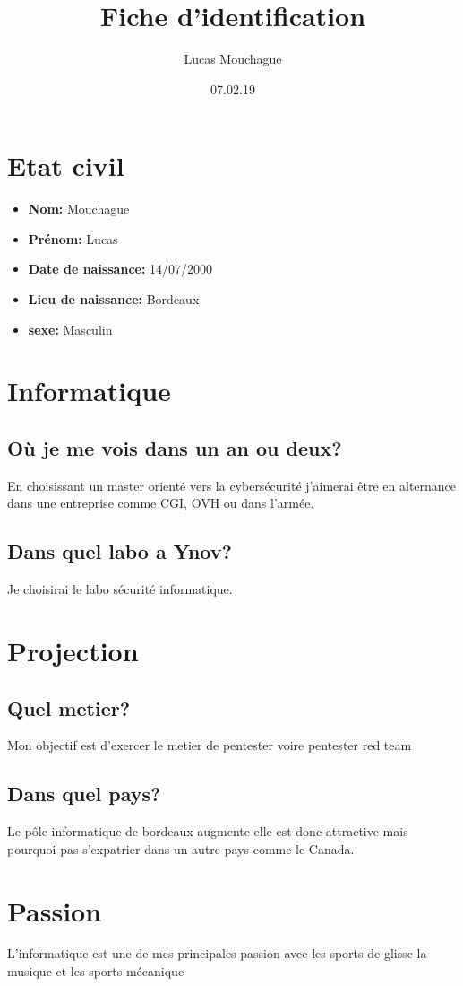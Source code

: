\documentclass{article}
\title{Fiche d'identification}
\author{Lucas Mouchague }
\date{07.02.19}
\begin{document}
\maketitle

\section{Etat civil}

\begin{itemize}
    \item\textbf{Nom:} Mouchague
    \item\textbf{Prénom:} Lucas   
    \item\textbf{Date de naissance:} 14/07/2000
    \item\textbf{Lieu de naissance:} Bordeaux
    \item\textbf{sexe:} Masculin
\end{itemize}

\section{Informatique}

\subsection{Où je me vois dans un an ou deux?}
En choisissant un master orienté vers la cybersécurité j'aimerai être en alternance dans une entreprise comme CGI, OVH ou dans l'armée.

\subsection{Dans quel labo a Ynov?}
Je choisirai le labo sécurité informatique.

\section{Projection}

\subsection{Quel metier?}
Mon objectif est d'exercer le metier de pentester voire pentester red team

\subsection{Dans quel pays?}
Le pôle informatique de bordeaux augmente elle est donc attractive mais pourquoi pas s'expatrier dans un autre pays comme le Canada.

\section{Passion}
L'informatique est une de mes principales passion avec les sports de glisse la musique et les sports mécanique
 
\end{document}
